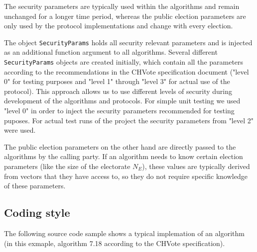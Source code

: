 The security parameters are typically used within the algorithms and remain unchanged for a longer time period, whereas the public election parameters are only used by the protocol implementations and change with every election.

The object \texttt{SecurityParams} holds all security relevant parameters and is injected as an additional function argument to all algorithms. Several different \texttt{SecurityParams} objects are created initially, which contain all the parameters according to the recommendations in the CHVote specification document ("level 0" for testing purposes and "level 1" through "level 3" for actual use of the protocol). This approach allows us to use different levels of security during development of the algorithms and protocols. For simple unit testing we used "level 0" in order to inject the security parameters recommended for testing puposes. For actual test runs of the project the security parameters from "level 2" were used.

The public election parameters on the other hand are directly passed to the algorithms by the calling party. If an algorithm needs to know certain election parameters (like the size of the electorate $N_E$), these values are typically derived from vectors that they have access to, so they do not require specific knowledge of these parameters.

\subsection{Coding style}
The following source code sample shows a typical implemation of an algorithm (in this exmaple, algorithm 7.18 according to the CHVote specification).

